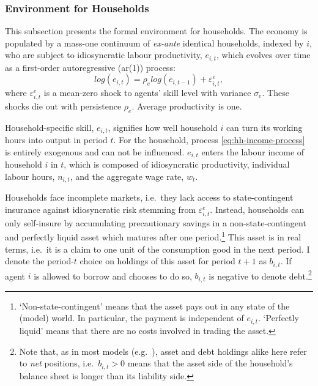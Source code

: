 \documentclass[a4paper,12pt]{article} %
\numberwithin{equation}{section} %
\numberwithin{figure}{section}
\numberwithin{table}{section}
\begin{document}
\subsubsection{Environment for Households}
\label{sec:model-hh-environment}

This subsection presents the formal environment for households. The economy is populated by a mass-one continuum of \textit{ex-ante} identical households, indexed by $i$, who are subject to idiosyncratic labour productivity, $e_{i,t}$, which evolves over time as a first-order autoregressive (\Gls{ar}(1)) process:
\begin{equation}
    log(e_{i,t}) = \rho_e log(e_{i,t-1}) + \varepsilon^e_{i,t}, \label{eq:hh-income-process}
\end{equation}
where $\varepsilon^e_{i,t}$ is a mean-zero shock to agents' skill level with variance $\sigma_e$. These shocks die out with persistence $\rho_e$. Average productivity is one.

Household-specific skill, $e_{i,t}$, signifies how well household $i$ can turn its working hours into output in period $t$. For the household, process \eqref{eq:hh-income-process} is entirely exogenous and can not be influenced. $e_{i,t}$ enters the labour income of household $i$ in $t$, which is composed of idiosyncratic productivity, individual labour hours, $n_{i,t}$, and the aggregate wage rate, $w_t$.

Households face incomplete markets, i.e.~they lack access to state-contingent insurance against idiosyncratic risk stemming from $\varepsilon^e_{i,t}$. Instead, households can only self-insure by accumulating precautionary savings in a non-state-contingent and perfectly liquid asset which matures after one period.\footnote{`Non-state-contingent' means that the asset pays out in any state of the (model) world. In particular, the payment is independent of $e_{i,t}$. `Perfectly liquid' means that there are no costs involved in trading the asset.} This asset is in real terms, i.e.~it is a claim to one unit of the consumption good in the next period. I denote the period-$t$ choice on holdings of this asset for period $t+1$ as $b_{i,t}$. If agent $i$ is allowed to borrow and chooses to do so, $b_{i,t}$ is negative to denote debt.\footnote{Note that, as in most models (e.g.~\cite{kaplan2018}), asset and debt holdings alike here refer to \textit{net} positions, i.e.~$b_{i,t} > 0$ means that the asset side of the household's balance sheet is longer than its liability side.}
\end{document}
